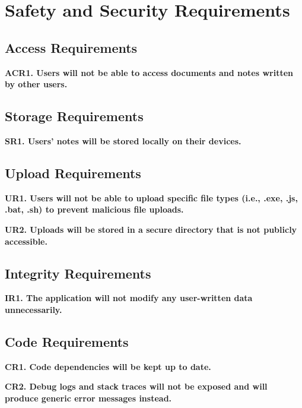 \documentclass{article}
\begin{document}
\newpage
{}
\recalctypearea

\section{Safety and Security Requirements}

\subsection{Access Requirements}
\begin{list}{}{\leftmargin=3em}
    \item \textbf{ACR1. Users will not be able to access documents and notes written by other users.}
\end{list}

\subsection{Storage Requirements}
\begin{list}{}{\leftmargin=3em}
    \item \textbf{SR1. Users' notes will be stored locally on their devices.}
\end{list}

\subsection{Upload Requirements}
\begin{list}{}{\leftmargin=3em}
    \item \textbf{UR1. Users will not be able to upload specific file types (i.e., .exe, .js, .bat, .sh) to prevent malicious file uploads.}
    \item \textbf{UR2. Uploads will be stored in a secure directory that is not publicly accessible.}
\end{list}

\subsection{Integrity Requirements}
\begin{list}{}{\leftmargin=3em}
    \item \textbf{IR1. The application will not modify any user-written data unnecessarily.}
\end{list}

\subsection{Code Requirements}
\begin{list}{}{\leftmargin=3em}
    \item \textbf{CR1. Code dependencies will be kept up to date.}
    \item \textbf{CR2. Debug logs and stack traces will not be exposed and will produce generic error messages instead.}
\end{list}
\end{document}

